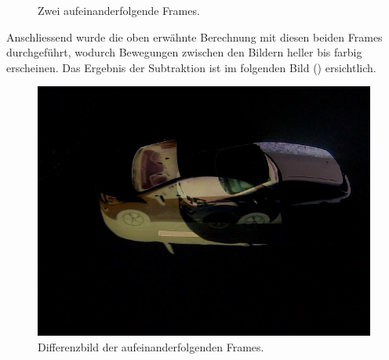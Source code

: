 \begin{figure}[H]
  \centering
  \caption{Zwei aufeinanderfolgende Frames.}
  \label{bFrames}
\end{figure}

Anschliessend wurde die oben erwähnte Berechnung mit diesen beiden Frames durchgeführt, wodurch Bewegungen zwischen den Bildern heller bis farbig erscheinen. Das Ergebnis der Subtraktion ist im folgenden Bild () ersichtlich.

\begin{figure}[H]
  \centering
  \includegraphics[height=0.3\textheight]{Software/Blur1.jpg} 
  \caption{Differenzbild der aufeinanderfolgenden Frames.}
  \label{bBlur1}
\end{figure} 

